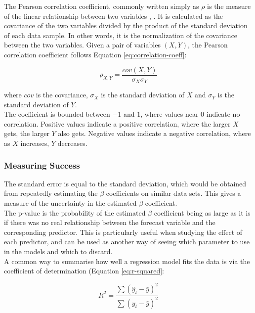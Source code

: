 The Pearson correlation coefficient, commonly written simply as $\rho$ is the measure of the linear relationship between two variables \cite{correlation-coeff-journal}, \cite{correlation-coeff}. It is calculated as the covariance of the two variables divided by the product of the standard deviation of each data sample. In other words, it is the normalization of the covariance between the two variables. Given a pair of variables $(X, Y)$, the Pearson correlation coefficient follows Equation \ref{eq:correlation-coeff}:

\begin{equation}
\label{eq:correlation-coeff}
    \rho_{X,Y} = \frac{cov(X,Y)}{\sigma_X\sigma_Y}
\end{equation}

where $cov$ is the covariance, $\sigma_X$ is the standard deviation of $X$ and $\sigma_Y$ is the standard deviation of $Y$. \\

The coefficient is bounded between $-1$ and $1$, where values near $0$ indicate no correlation. Positive values indicate a positive correlation, where the larger $X$ gets, the larger $Y$ also gets. Negative values indicate a negative correlation, where as $X$ increases, $Y$ decreases.

\subsubsection{Measuring Success}

The standard error is equal to the standard deviation, which would be obtained from repeatedly estimating the $\beta$ coefficients on similar data sets. This gives a measure of the uncertainty in the estimated $\beta$ coefficient. \\

The p-value is the probability of the estimated $\beta$ coefficient being as large as it is if there was no real relationship between the forecast variable and the corresponding predictor. This is particularly useful when studying the effect of each predictor, and can be used as another way of seeing which parameter to use in the models and which to discard. \\ 

A common way to summarise how well a regression model fits the data is via the coefficient of determination (Equation \ref{eq:r-squared}:

\begin{equation}
    R^2 = \frac{\sum(\hat y_t - \bar y)^2}{\sum(y_t - \bar y)^2}
    \label{eq:r-squared}
\end{equation}

